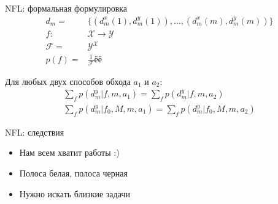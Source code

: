 \documentclass[14pt, fleqn, xcolor={dvipsnames, table}]{beamer}
\begin{document}
\begin{frame}{NFL: формальная формулировка}
$$\begin{array}{rl}
d_m =& \{(d^x_m(1), d^y_m(1)), \ldots, (d^x_m(m), d^y_m(m))\} \\
f: & \mathcal{X} \to \mathcal{Y} \\
\mathcal{F}= & \mathcal{Y}^\mathcal{X} \\
p(f) = & \frac{1}{\mathcal{F}} ёё
\end{array}$$

\begin{theorem}
Для любых двух способов обхода $a_1$ и $a_2$:
$$\begin{array}{rl}
\sum_f p(d^y_m|f,m,a_1) = \sum_f p(d^y_m|f,m,a_2) \\
\sum_f p(d^y_m|f_0,M,m,a_1) = \sum_f p(d^y_m|f_0,M,m,a_2)
\end{array}$$
\end{theorem}
\end{frame}

\begin{frame}{NFL: следствия}
\begin{itemize}
  \item Нам всем хватит работы :)
  \item Полоса белая, полоса черная
  \item Нужно искать близкие задачи
\end{itemize}
\end{frame}
\end{document}
